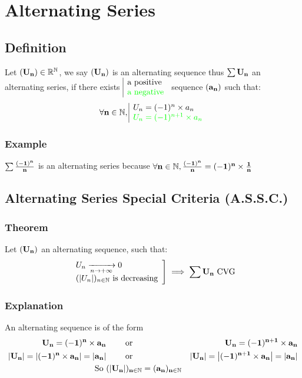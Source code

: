 \documentclass[notitlepage]{math}
\begin{document}
\section{Alternating Series}
\subsection{Definition}
Let $\bf (U_n) \in \mathbb{R}^\mathbb{N}$, we say $\bf (U_n)$ is an alternating sequence thus $\bf \sum U_n$ an alternating series, if there exists $\begin{array}{|l} \text{a positive} \\ \color{green}\text{a negative}\end{array}$ sequence $\bf (a_n)$ such that:
\[\bf \forall n \in \mathbb{N}, \begin{array}{|l} U_{n} = (-1)^n \times a_n \\ \color{green} U_{n} = (-1)^{n+1} \times a_n \end{array}\]
\subsubsection{Example}
$\bf \sum \frac{(-1)^n}{n}$ is an alternating series because $\bf \forall n \in \mathbb{N}, \frac{(-1)^n}{n} = (-1)^n \times \frac{1}{n}$
\subsection{Alternating Series Special Criteria (A.S.S.C.)}
\subsubsection{Theorem}
Let $\bf (U_n)$ an alternating sequence, such that:
\[\bf \left. \begin{array}{l}
    U_n \xrightarrow[n \to +\infty]{} 0\\
    (\left\lvert U_n \right\rvert )_{n \in \mathbb{N}} \text{ is decreasing}
\end{array} \right] \implies \sum U_n \text{ CVG}\]
\subsubsection{Explanation}
An alternating sequence is of the form 
\begin{align*}
    \bf U_n = (-1)^n \times a_n & \qquad \text{ or } & \bf U_n = (-1)^{n+1} \times a_n\\
\bf \left\lvert U_n \right\rvert = \left\lvert (-1)^n \times a_n \right\rvert = \left\lvert a_n \right\rvert & \qquad \text{ or } & \bf \left\lvert U_{n} \right\rvert = \left\lvert (-1)^{n+1} \times a_{n} \right\rvert = \left\lvert a_{n} \right\rvert\\
\text{So }& \bf (\left\lvert U_n \right\rvert )_{n \in \mathbb{N}} = (a_n)_{n \in \mathbb{N}}&\\
\end{align*}
\end{document}
